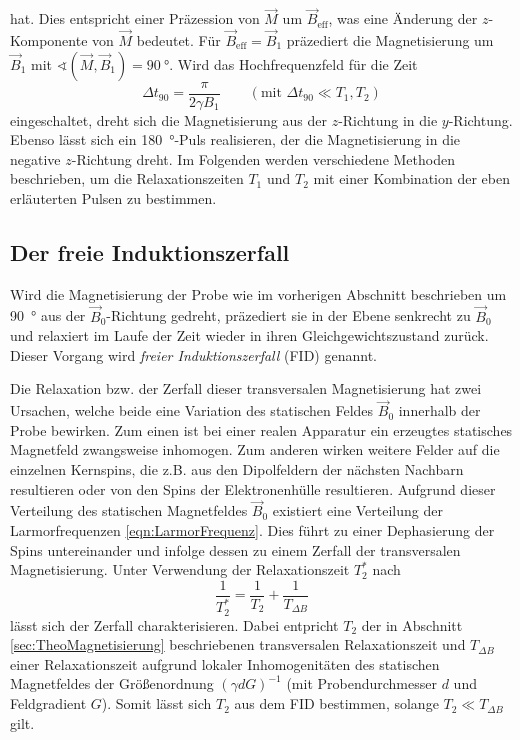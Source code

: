 hat.
Dies entspricht einer Präzession von $\vec{M}$ um $\vec{B}_\text{eff}$,
was eine Änderung der $z$-Komponente von $\vec{M}$ bedeutet.
Für $\vec{B}_\text{eff} = \vec{B}_1$ präzediert die Magnetisierung um $\vec{B}_1$
mit $\sphericalangle\!\left(\vec{M}, \vec{B}_1\right) = \SI{90}{\degree}$.
Wird das Hochfrequenzfeld für die Zeit
\begin{equation}
  \Delta t_{90} = \frac{\pi}{2 \gamma B_1}
  \quad\quad (\text{mit } \Delta t_{90} \ll T_1, T_2)
  \label{eqn:t90}
\end{equation}
eingeschaltet, dreht sich die Magnetisierung aus der $z$-Richtung in die
$y$-Richtung.
Ebenso lässt sich ein \SI{180}{\degree}-Puls realisieren, der die Magnetisierung
in die negative $z$-Richtung dreht.
Im Folgenden werden verschiedene Methoden beschrieben, um die Relaxationszeiten
$T_1$ und $T_2$ mit einer Kombination der eben erläuterten Pulsen zu bestimmen.


\subsection{Der freie Induktionszerfall}
\label{sec:FID}

Wird die Magnetisierung der Probe wie im vorherigen Abschnitt beschrieben um \SI{90}{\degree}
aus der $\vec{B}_0$-Richtung gedreht, präzediert sie in der Ebene senkrecht zu
$\vec{B}_0$ und relaxiert im Laufe der Zeit wieder in ihren Gleichgewichtszustand
zurück. Dieser Vorgang wird \emph{freier Induktionszerfall} (FID) genannt.

Die Relaxation bzw. der Zerfall dieser transversalen Magnetisierung hat zwei Ursachen,
welche beide eine Variation des statischen Feldes $\vec{B}_0$ innerhalb der
Probe bewirken.
Zum einen ist bei einer realen Apparatur ein erzeugtes statisches Magnetfeld
zwangsweise inhomogen.
Zum anderen wirken weitere Felder auf die einzelnen Kernspins,
die z.B. aus den Dipolfeldern der nächsten Nachbarn resultieren oder von den
Spins der Elektronenhülle resultieren.
Aufgrund dieser Verteilung des statischen Magnetfeldes $\vec{B}_0$ existiert eine
Verteilung der Larmorfrequenzen \eqref{eqn:LarmorFrequenz}.
Dies führt zu einer Dephasierung der Spins untereinander und infolge dessen
zu einem Zerfall der transversalen Magnetisierung.
Unter Verwendung der Relaxationszeit $T_2^*$ nach
\begin{equation*}
  \frac{1}{T_2^*} = \frac{1}{T_2} + \frac{1}{T_{\Delta B}}
\end{equation*}
lässt sich der Zerfall charakterisieren.
Dabei entpricht $T_2$ der in Abschnitt \ref{sec:TheoMagnetisierung} beschriebenen
transversalen Relaxationszeit und $T_{\Delta B}$ einer Relaxationszeit aufgrund
lokaler Inhomogenitäten des statischen Magnetfeldes der Größenordnung
$\left(\gamma d G\right)^{-1}$
(mit Probendurchmesser $d$ und Feldgradient $G$).
Somit lässt sich $T_2$ aus dem FID bestimmen, solange $T_2 \ll T_{\Delta B}$
gilt.

